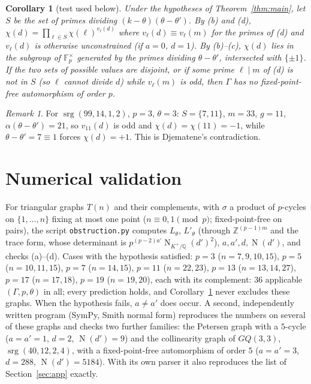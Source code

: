 \documentclass[11pt,a4paper]{article}
\newtheorem{corollary}[theorem]{Corollary}
\theoremstyle{remark}
\newtheorem{remark}[theorem]{Remark}
\newcommand{\Z}{\mathbb{Z}}
\newcommand{\Q}{\mathbb{Q}}
\newcommand{\F}{\mathbb{F}}
\newcommand{\srg}{\operatorname{srg}}
\newcommand{\Nm}{\operatorname{N}}
\begin{document}
\begin{corollary}[test used below]\label{cor:test}
Under the hypotheses of Theorem~\ref{thm:main}, let $S$ be the set of primes dividing $(k-\theta)(\theta-\theta')$. By (b) and (d),
$\chi(d)=\prod_{\ell\in S}\chi(\ell)^{v_\ell(d)}$ where $v_\ell(d)\equiv v_\ell(m)$ for the primes of (d) and $v_\ell(d)$ is
otherwise unconstrained (if $a=0$, $d=1$). By (b)--(c), $\chi(d)$ lies in the subgroup of $\F_p^\times$ generated by the primes
dividing $\theta-\theta'$, intersected with $\{\pm1\}$. If the two sets of possible values are disjoint, or if some prime
$\ell\mid m$ of (d) is not in $S$ (so $\ell$ cannot divide $d$) while $v_\ell(m)$ is odd, then $\Gamma$ has no fixed-point-free automorphism of order $p$.
\end{corollary}

\begin{remark}
For $\srg(99,14,1,2)$, $p=3$, $\theta=3$: $S=\{7,11\}$, $m=33$, $g=11$, $\alpha(\theta-\theta')=21$, so $v_{11}(d)$ is odd and
$\chi(d)=\chi(11)=-1$, while $\theta-\theta'=7\equiv1$ forces $\chi(d)=+1$. This is Djematene's contradiction.
\end{remark}

\section{Numerical validation}\label{sec:val}
For triangular graphs $T(n)$ and their complements, with $\sigma$ a product of $p$-cycles on $\{1,\dots,n\}$ fixing at most one
point ($n\equiv0,1\pmod p$; fixed-point-free on pairs), the script \texttt{obstruction.py} computes $L_\theta$, $L'_\theta$
(through $\Z^{(p-1)m}$ and the trace form, whose determinant is $p^{(p-2)a'}\Nm_{K^+/\Q}(d')^2$), $a,a',d,\Nm(d')$, and checks
(a)--(d). Cases with the hypothesis satisfied: $p=3$ ($n=7,9,10,15$), $p=5$ ($n=10,11,15$), $p=7$ ($n=14,15$), $p=11$
($n=22,23$), $p=13$ ($n=13,14,27$), $p=17$ ($n=17,18$), $p=19$ ($n=19,20$), each with its complement: 36 applicable
$(\Gamma,p,\theta)$ in all; every prediction holds, and Corollary~\ref{cor:test} never excludes these graphs. When the
hypothesis fails, $a\neq a'$ does occur. A second, independently written program (SymPy, Smith normal form) reproduces the
numbers on several of these graphs and checks two further families: the Petersen graph with a $5$-cycle ($a=a'=1$, $d=2$,
$\Nm(d')=9$) and the collinearity graph of $GQ(3,3)$, $\srg(40,12,2,4)$, with a fixed-point-free automorphism of order $5$
($a=a'=3$, $d=288$, $\Nm(d')=5184$). With its own parser it also reproduces the list of Section~\ref{sec:app} exactly.
\end{document}
